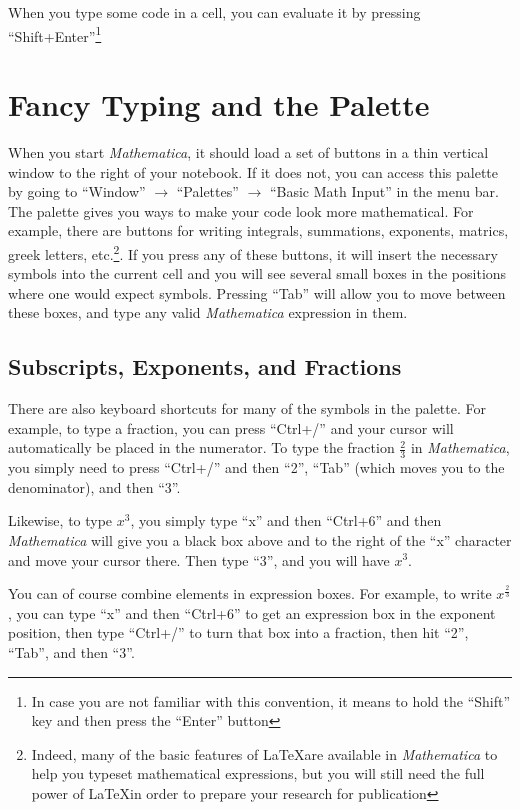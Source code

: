 When you type some code in a cell, you can evaluate it by pressing ``Shift+Enter''\footnote{In case you are not familiar with this convention, it means to hold the ``Shift'' key and then press the ``Enter'' button}

\section{Fancy Typing and the Palette}

When you start \emph{Mathematica}, it should load a set of buttons in a thin vertical window to the right of your notebook. If it does not, you can access this palette by going to ``Window'' $\rightarrow$ ``Palettes'' $\rightarrow$ ``Basic Math Input'' in the menu bar. The palette gives you ways to make your code look more mathematical. For example, there are buttons for writing integrals, summations, exponents, matrics, greek letters, etc.\footnote{Indeed, many of the basic features of \LaTeX are available in \emph{Mathematica} to help you typeset mathematical expressions, but you will still need the full power of \LaTeX in order to prepare your research for publication}. If you press any of these buttons, it will insert the necessary symbols into the current cell and you will see several small boxes in the positions where one would expect symbols. Pressing ``Tab'' will allow you to move between these boxes, and type any valid \emph{Mathematica} expression in them.

\subsection{Subscripts, Exponents, and Fractions}

There are also keyboard shortcuts for many of the symbols in the palette. For example, to type a fraction, you can press ``Ctrl+/'' and your cursor will automatically be placed in the numerator. To type the fraction $\frac{2}{3}$ in \emph{Mathematica}, you simply need to press ``Ctrl+/'' and then ``2'', ``Tab'' (which moves you to the denominator), and then ``3''.

Likewise, to type $x^3$, you simply type ``x'' and then ``Ctrl+6'' and then \emph{Mathematica} will give you a black box above and to the right of the ``x'' character and move your cursor there. Then type ``3'', and you will have $x^3$.

You can of course combine elements in expression boxes. For example, to write $x^{\frac{2}{3}}$, you can type ``x'' and then ``Ctrl+6'' to get an expression box in the exponent position, then type ``Ctrl+/'' to turn that box into a fraction, then hit ``2'', ``Tab'', and then ``3''.

